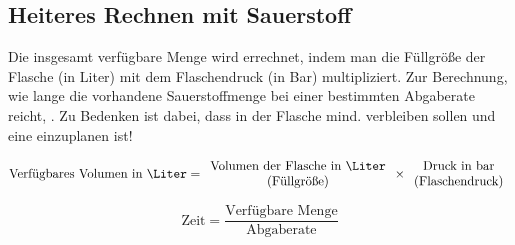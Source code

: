\subsection{Heiteres Rechnen mit Sauerstoff}

Die insgesamt verfügbare Menge wird errechnet, indem man
die Füllgröße der Flasche (in Liter) mit dem
Flaschendruck (in Bar) multipliziert. Zur Berechnung, wie
lange die vorhandene Sauerstoffmenge bei einer bestimmten
Abgaberate reicht, .
Zu Bedenken ist dabei, dass in der Flasche  mind.
 verbleiben sollen und eine
 einzuplanen ist!  

{\FontSansNarrowFamily
\begin{equation}
\text{Verfügbares Volumen in \Liter} = {\begin{array}{c}
\text{Volumen der Flasche in \Liter}\\
\text{(Füllgröße)} \end{array}}
\times 
\begin{array}{c}{\text{Druck in bar}}\\
\text{(Flaschendruck)}
\end{array}
\end{equation}

\begin{equation}
\text{Zeit} = \frac{\text{Verfügbare
Menge}}{\text{Abgaberate}}
\end{equation}
}
% 














